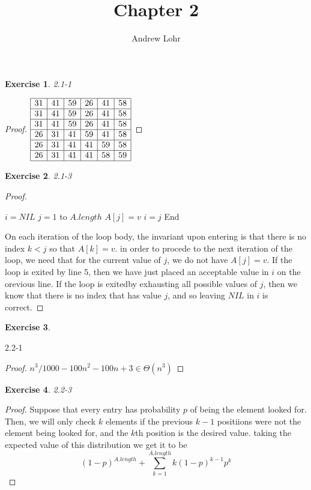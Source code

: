\documentclass{article}
\title{Chapter 2}
\author{Andrew Lohr}
\newtheorem{th1}{Exercise}
\begin{document}
\maketitle

\begin{th1}\label{ex1}
2.1-1
\end{th1}
\begin{proof}
$
\begin{array}{|c|c|c|c|c|c|}
\hline
31&41&59&26&41&58\\
\hline
31&41&59&26&41&58\\
\hline
31&41&59&26&41&58\\
\hline
26&31&41&59&41&58\\
\hline
26&31&41&41&59&58\\
\hline
26&31&41&41&58&59\\
\hline
\end{array}
$
\end{proof}

\begin{th1}\label{ex2}
2.1-3
\end{th1}
\begin{proof}
\begin{algorithm} \begin{algorithmic}[1]
 \State $i=NIL$
 \For $j = 1$ to $A.length$
 \If $A[j] = v$
 \State $i = j$
 \State End
 \EndIf 
 \EndFor
 \end{algorithmic}
\end{algorithm}
On each iteration of the loop body, the invariant upon entering is that there is no index $k<j$ so that $A[k]=v$. in order to procede to the next iteration of the loop, we need that for the current value of $j$, we do not have $A[j] =v$. If the loop is exited by line 5, then we have just placed an acceptable value in $i$ on the orevious line. If the loop is exitedby exhausting all possible values of $j$, then we know that there is no index that has value $j$, and so leaving $NIL$ in $i$ is correct. 
\end{proof}

\begin{th1}\label{ex3}
\end{th1}
2.2-1
\begin{proof}
$n^3/1000 - 100n^2-100n +3 \in \Theta(n^3)$
\end{proof}
\begin{th1}\label{ex4}
2.2-3
\end{th1}
\begin{proof}
Suppose that every entry has probability $p$ of being the element looked for. Then, we will only check $k$ elements if the previous $k-1$ positiions were not the element being looked for, and the $k$th position is the desired value. taking the expected value of this distribution we get it to be
\[
(1-p)^{A.length} + \sum_{k=1}^{A.length} k(1-p)^{k-1}p^k
\]
\end{proof}
\end{document}
